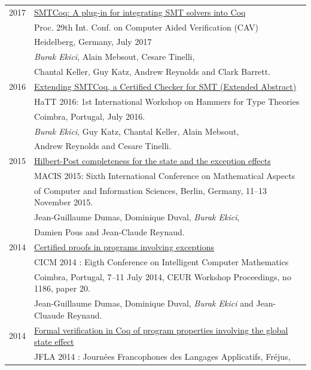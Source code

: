 \documentclass[a4paper,9pt]{article} %
\begin{document}
\begin{longtable}{ll}
 \\[0.20cm]
2017 & 
{\href{http://homepage.divms.uiowa.edu/~tinelli/papers/EkiEtAl-CAV-17.pdf}{SMTCoq: A plug-in for integrating SMT solvers into Coq}}\\
& Proc. 29th Int. Conf. on Computer Aided Verification (CAV) \\
& Heidelberg, Germany, July 2017 \\
& \emph{Burak Ekici}, Alain Mebsout, Cesare Tinelli,\\
& Chantal Keller, Guy Katz, Andrew Reynolds and Clark Barrett. 
 \\[0.20cm]
2016 & {\href{http://eptcs.web.cse.unsw.edu.au/paper.cgi?HaTT2016.5}{Extending SMTCoq, a Certified Checker for SMT (Extended Abstract)}} \\
& HaTT 2016: 1st International Workshop on Hammers for Type Theories\\
& Coimbra, Portugal, July 2016.\\
& \emph{Burak Ekici}, Guy Katz, Chantal Keller, Alain Mebsout,\\
& Andrew Reynolds and Cesare Tinelli.
 \\[0.20cm]
2015& \href{https://hal.archives-ouvertes.fr/hal-01121924}{Hilbert-Post completeness for the state and the exception effects}\\
& MACIS 2015: Sixth International Conference on Mathematical Aspects\\
& of Computer and Information Sciences, Berlin,
Germany, 11–13 November 2015.\\
& Jean-Guillaume Dumas, Dominique Duval, \emph{Burak Ekici}, \\
& Damien Pous and Jean-Claude Reynaud. 
 \\[0.20cm]
2014 & \href{https://hal.archives-ouvertes.fr/hal-00867237}{Certified proofs in programs involving exceptions}\\
& CICM 2014 : Eigth Conference on Intelligent Computer Mathematics \\
& Coimbra, Portugal, 7--11 July 2014, {CEUR Workshop Proceedings, no 1186, paper 20. }\\
&  Jean-Guillaume Dumas, Dominique Duval, \emph{Burak Ekici} and Jean-Cluaude Reynaud.
 \\[0.20cm]
2014 & {\href{https://hal.archives-ouvertes.fr/hal-00869230}{Formal verification in Coq of program properties involving the global state effect}}\\
& JFLA 2014 : Journées Francophones des Langages Applicatifs, Fréjus,\\

\end{longtable}
\end{document}
